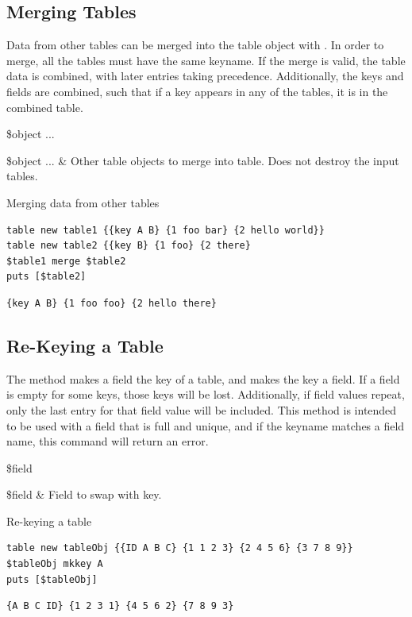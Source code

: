 \subsection{Merging Tables}
Data from other tables can be merged into the table object with . 
In order to merge, all the tables must have the same keyname.
If the merge is valid, the table data is combined, with later entries taking precedence. 
Additionally, the keys and fields are combined, such that if a key appears in any of the tables, it is in the combined table.

\begin{syntax}
 \$object ...
\end{syntax}
\begin{args}
\$object ... & Other table objects to merge into table. Does not destroy the input tables. 
\end{args}

\begin{example}{Merging data from other tables}
\begin{lstlisting}
table new table1 {{key A B} {1 foo bar} {2 hello world}}
table new table2 {{key B} {1 foo} {2 there}
$table1 merge $table2
puts [$table2]
\end{lstlisting}
\tcblower
\begin{lstlisting}
{key A B} {1 foo foo} {2 hello there}
\end{lstlisting}
\end{example}
\clearpage
\subsection{Re-Keying a Table}
The method  makes a field the key of a table, and makes the key a field. 
If a field is empty for some keys, those keys will be lost. 
Additionally, if field values repeat, only the last entry for that field value will be included. 
This method is intended to be used with a field that is full and unique, and if the keyname matches a field name, this command will return an error.
\begin{syntax}
 \$field
\end{syntax}
\begin{args}
\$field & Field to swap with key.
\end{args}

\begin{example}{Re-keying a table}
\begin{lstlisting}
table new tableObj {{ID A B C} {1 1 2 3} {2 4 5 6} {3 7 8 9}}
$tableObj mkkey A
puts [$tableObj]
\end{lstlisting}
\tcblower
\begin{lstlisting}
{A B C ID} {1 2 3 1} {4 5 6 2} {7 8 9 3}
\end{lstlisting}
\end{example}
\clearpage
